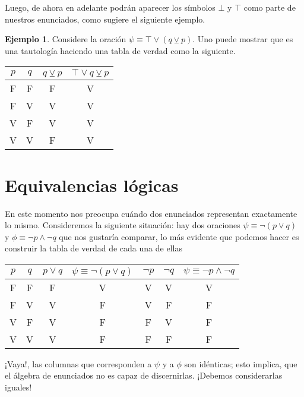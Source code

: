 \documentclass{book}
\theoremstyle{definition}
\newtheorem*{ejm}{Ejemplo}
\begin{document}
Luego, de ahora en adelante podrán aparecer los símbolos $\bot$ y $\top$ como parte de nuestros enunciados, como sugiere el siguiente ejemplo.

\begin{ejm}
	Considere la oración $\psi \equiv \top \vee (q \veebar p)$. Uno puede mostrar que es una tautología haciendo una tabla de verdad como la siguiente.
	\begin{center}\begin{tabular}{|c|c||c|c|}
		\hline
		$p$ & $q$ & $q\veebar p$ & $\top \vee q\veebar p$ \\
		\hline\hline
		F & F & F & V \\ \hline
		F & V & V & V \\ \hline
		V & F & V & V \\ \hline
		V & V & F & V \\ \hline
	\end{tabular}\end{center}
\end{ejm}

\section{Equivalencias lógicas}
En este momento nos preocupa cuándo dos enunciados representan exactamente lo mismo.
Consideremos la siguiente situación: hay dos oraciones $\psi \equiv \neg (p \vee q)$ y $\phi \equiv \neg p \wedge \neg q$ que nos gustaría comparar, lo más evidente que podemos hacer es construir la tabla de verdad de cada una de ellas
\begin{center}\begin{tabular}{|c|c||c|c|c|c|c|}
	\hline
	$p$ & $q$ & $p\vee q$ & $\psi \equiv \neg (p \vee q)$ & $\neg p$ & $\neg q$ & $\psi \equiv \neg p \wedge \neg q$ \\
	\hline\hline
	F & F & F & V & V & V & V \\ \hline
	F & V & V & F & V & F & F \\ \hline
	V & F & V & F & F & V & F \\ \hline
	V & V & V & F & F & F & F \\ \hline
\end{tabular}\end{center}
¡Vaya!, las columnas que corresponden a $\psi$ y a $\phi$ son idénticas; esto implica, que el álgebra de enunciados no es capaz de discernirlas. ¡Debemos considerarlas iguales!
\end{document}
